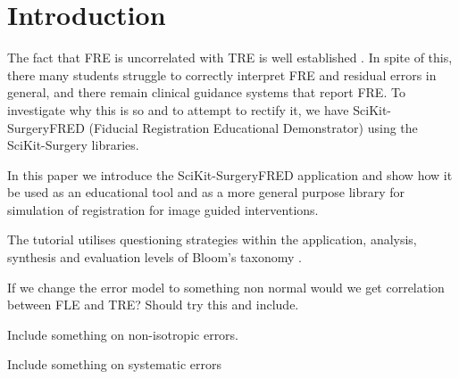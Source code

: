 \section{Introduction}
The fact that \gls{FRE} is uncorrelated with \gls{TRE} is well established 
\cite{fitzpatrick2009}. In spite of this, there many students struggle to 
correctly interpret \gls{FRE} and residual errors in general, and there 
remain clinical guidance 
systems that report \gls{FRE}. 
To investigate why this is so and to attempt to rectify
 it, we have SciKit-SurgeryFRED (Fiducial Registration Educational Demonstrator)
 \cite{stephen_thompson_2020_3946090} using the 
SciKit-Surgery \cite{PMID:32436132} libraries.

In this paper we introduce the SciKit-SurgeryFRED application and show how it
be used as an educational tool and as a more general purpose library for
simulation of registration for image guided interventions.

The tutorial utilises questioning strategies within the application, analysis, synthesis and evaluation levels of Bloom's taxonomy \cite{blooms_tax}.

If we change the error model to something non normal would we get correlation between FLE and TRE? Should try this and include.

Include something on non-isotropic errors.

Include something on systematic errors


